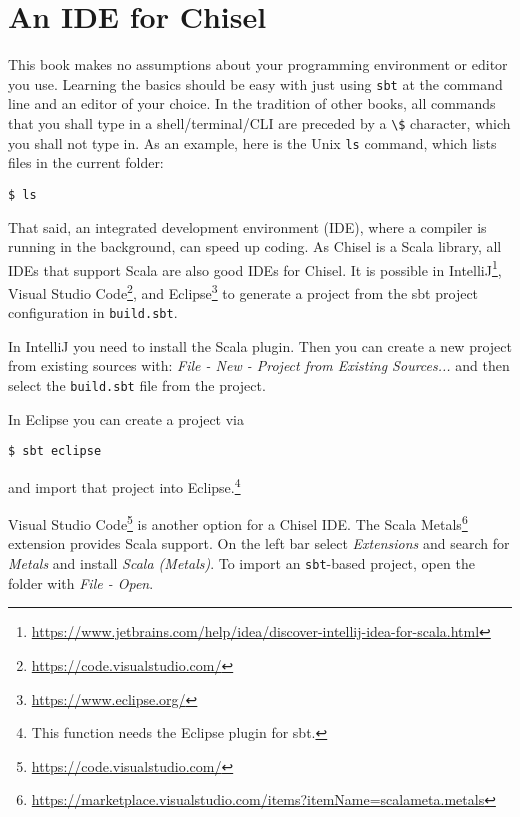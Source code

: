 \documentclass[%
    10pt,
    headinclude, footexclude,
    openright, %
    notitlepage,
    cleardoubleempty,
    headsepline,
    pointlessnumbers,
    bibtotoc, idxtotoc,
    ]{scrbook}
\newcommand{\code}[1]{{\lstinline[basicstyle=\small\ttfamily]{#1}}}
\newcommand{\myref}[2]{\href{#1}{#2}}
\renewcommand{\myref}[2]{{#2}{\footnote{\url{#1}}}}
\begin{document}
\section{An IDE for Chisel}

This book makes no assumptions about your programming environment or editor you use.
Learning the basics should be easy with just using \code{sbt} at the command line
and an editor of your choice. In the tradition of other books, all commands that you
shall type in a shell/terminal/CLI are preceded by a \code{\$} character, which you
shall not type in. As an example, here is the Unix \code{ls} command, which lists files in
the current folder:

\begin{verbatim}
$ ls
\end{verbatim}

That said, an integrated development environment (IDE), where a compiler is running in
the background, can speed up coding. As Chisel is a Scala library, all IDEs
that support Scala are also good IDEs for Chisel.
It is possible in
\myref{https://www.jetbrains.com/help/idea/discover-intellij-idea-for-scala.html}{IntelliJ},
\myref{https://code.visualstudio.com/}{Visual Studio Code}, and
 \myref{https://www.eclipse.org/}{Eclipse}
to generate a project from the sbt project configuration in \code{build.sbt}.

In IntelliJ you need to install the Scala plugin. Then you can create a new project from existing sources with:
\emph{File - New - Project from Existing Sources...} and then select the \code{build.sbt}
file from the project.

In Eclipse you can create a project via
\begin{verbatim}
$ sbt eclipse
\end{verbatim}
and import that project into Eclipse.\footnote{This function needs the Eclipse plugin for sbt.}

\myref{https://code.visualstudio.com/}{Visual Studio Code} is another option for a Chisel IDE.
The \myref{https://marketplace.visualstudio.com/items?itemName=scalameta.metals}{Scala Metals}
extension provides Scala support.
On the left bar select \emph{Extensions} and search for \emph{Metals} and install \emph{Scala (Metals)}.
To import an \code{sbt}-based project, open the folder with \emph{File - Open}.

\end{document}
